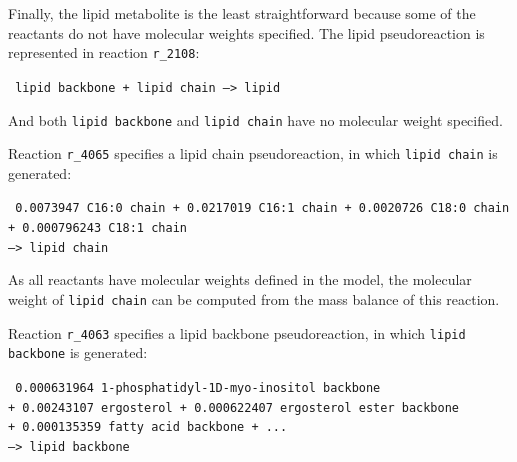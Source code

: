 Finally, the lipid metabolite is the least straightforward because some of the reactants do not have molecular weights specified.
The lipid pseudoreaction is represented in reaction \texttt{r\_2108}:

\texttt{
  lipid backbone + lipid chain --> lipid
}

And both \texttt{lipid backbone} and \texttt{lipid chain} have no molecular weight specified.

Reaction \texttt{r\_4065} specifies a lipid chain pseudoreaction, in which \texttt{lipid chain} is generated:

\texttt{
  0.0073947 C16:0 chain + 0.0217019 C16:1 chain + 0.0020726 C18:0 chain \\
  + 0.000796243 C18:1 chain \\
  --> lipid chain
}

As all reactants have molecular weights defined in the model, the molecular weight of \texttt{lipid chain} can be computed from the mass balance of this reaction.

Reaction \texttt{r\_4063} specifies a lipid backbone pseudoreaction, in which \texttt{lipid backbone} is generated:

\texttt{
  0.000631964 1-phosphatidyl-1D-myo-inositol backbone\\
  + 0.00243107 ergosterol + 0.000622407 ergosterol ester backbone\\
  + 0.000135359 fatty acid backbone + ...\\
  --> lipid backbone
}

